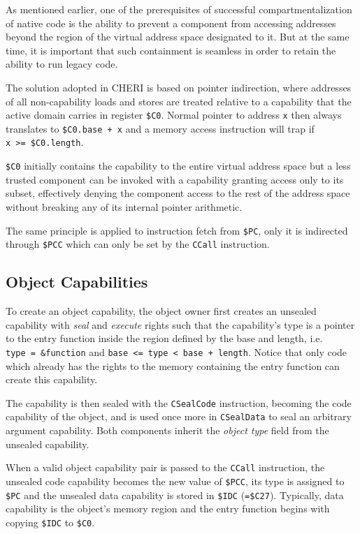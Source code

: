 \documentclass[a4paper,12pt,twoside,openright]{report}
\newcommand{\reg}[1]{\texttt{\$#1}}
\newcommand{\insn}[1]{\texttt{#1}}
\begin{document}
As mentioned earlier, one of the prerequisites of successful compartmentalization of native code is the ability to prevent a component from accessing addresses beyond the region of the virtual address space designated to it. But at the same time, it is important that such containment is seamless in order to retain the ability to run legacy code.

The solution adopted in CHERI is based on pointer indirection, where addresses of all non-capability loads and stores are treated relative to a capability that the active domain carries in register \reg{C0}. Normal pointer to address \texttt{x} then always translates to \texttt{\reg{C0}.base~+~x} and a memory access instruction will trap if \texttt{x~>=~\reg{C0}.length}. 

\reg{C0} initially contains the capability to the entire virtual address space but a less trusted component can be invoked with a capability granting access only to its subset, effectively denying the component access to the rest of the address space without breaking any of its internal pointer arithmetic.

The same principle is applied to instruction fetch from \reg{PC}, only it is indirected through \reg{PCC} which can only be set by the \insn{CCall} instruction.

\subsection{Object Capabilities}

To create an object capability, the object owner first creates an unsealed capability with \emph{seal} and \emph{execute} rights such that the capability's type is a pointer to the entry function inside the region defined by the base and length, i.e. \texttt{type~=~\&function} and \texttt{base~<=~type~<~base~+~length}. Notice that only code which already has the rights to the memory containing the entry function can create this capability. 

The capability is then sealed with the \insn{CSealCode} instruction, becoming the code capability of the object, and is used once more in \insn{CSealData} to seal an arbitrary argument capability. Both components inherit the \emph{object type} field from the unsealed capability.

When a valid object capability pair is passed to the \insn{CCall} instruction, the unsealed code capability becomes the new value of \reg{PCC}, its type is assigned to \reg{PC} and the unsealed data capability is stored in \reg{IDC} (\texttt{=\reg{C27}}). Typically, data capability is the object's memory region and the entry function begins with copying \reg{IDC} to \reg{C0}.
\end{document}
